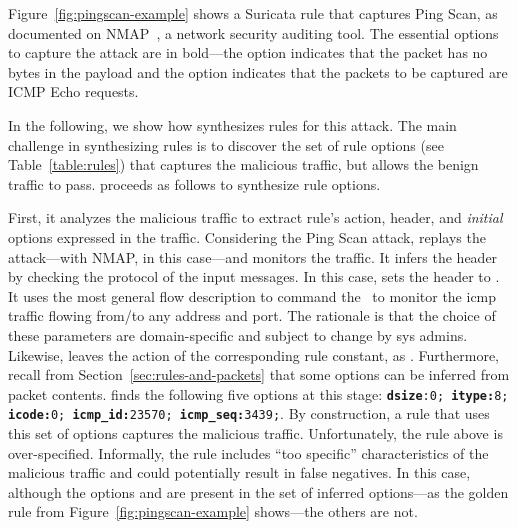 \documentclass[conference]{IEEEtran}
\begin{document}
Figure~\ref{fig:pingscan-example} shows a Suricata rule that captures
Ping Scan, as documented on NMAP~\cite{netmap}, a network security
auditing tool. The essential options to capture the attack are in
bold---the option  indicates that the packet has no
bytes in the payload and the option  indicates that
the packets to be captured are ICMP Echo requests.


In the following, we show how \tname{} synthesizes rules for this
attack. The main challenge in synthesizing rules is to discover the
set of rule options (see Table~\ref{table:rules}) that captures the
malicious traffic, but allows the benign traffic to pass. \tname{}
proceeds as follows to synthesize rule options.


First, it analyzes the malicious traffic to extract rule's action,
header, and \emph{initial} options expressed in the
traffic. Considering the Ping Scan attack, \tname{} replays the
attack---with NMAP, in this case---and monitors the traffic.  It
infers the header by checking the protocol of the input messages. In
this case, \tname{} sets the header to . It uses the most general flow description to command the
\nids\ to monitor the icmp traffic flowing from/to any address and
port.  The rationale is that the choice of these parameters are
domain-specific and subject to change by sys admins. Likewise,
\tname{} leaves the action of the corresponding rule constant, as
. Furthermore, recall from
Section~\ref{sec:rules-and-packets} that some options can be inferred
from packet contents. \tname{} finds the following five options at
this stage: {\scriptsize{\texttt{\textbf{dsize}:0; \textbf{itype:}8;
      \textbf{icode:}0; \textbf{icmp\_id:}23570;
      \textbf{icmp\_seq:}3439;}}}.  By construction, a rule that uses
this set of options captures the malicious traffic. Unfortunately, the
rule above is over-specified. Informally, the rule includes ``too
specific'' characteristics of the malicious traffic and could
potentially result in false negatives. In this case, although the
options  and  are present in the set
of inferred options---as the golden rule from
Figure~\ref{fig:pingscan-example} shows---the others are not.
\end{document}
